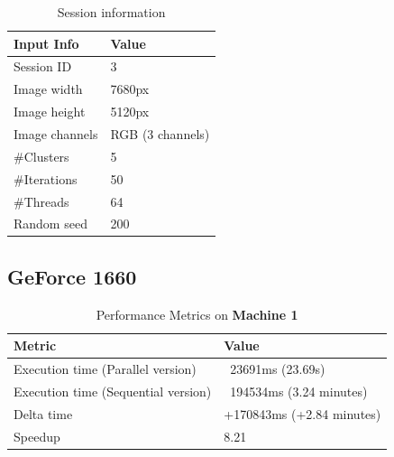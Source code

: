     \begin{table}[H]
        \centering
        \begin{tabular}{|l|l|}
        \hline
        \textbf{Input Info}                    & \textbf{Value}                       \\ \hline
        Session ID                             & 3                                     \\ \hline
        Image width                            & 7680px                                \\ \hline
        Image height                           & 5120px                                \\ \hline
        Image channels                         & RGB (3 channels)                      \\ \hline
        \#Clusters                             & 5                                     \\ \hline
        \#Iterations                           & 50                                    \\ \hline
        \#Threads                              & 64                                    \\ \hline
        Random seed                            & 200                                   \\ \hline
        \end{tabular}
        \caption{Session information}
        \label{tab:session_information_test4}
        \end{table}
        

\subsection{GeForce 1660}

\begin{table}[H]
    \centering
    \begin{tabular}{|l|l|}
    \hline
    \textbf{Metric}                         & \textbf{Value}                       \\ \hline
    Execution time (Parallel version)       & ~23691ms (23.69s)                     \\ \hline
    Execution time (Sequential version)     & ~194534ms (3.24 minutes)              \\ \hline
    Delta time                               & +170843ms (+2.84 minutes)            \\ \hline
    Speedup                                  & 8.21                                   \\ \hline
    \end{tabular}
    \caption{Performance Metrics on \textbf{Machine 1}}
    \label{table:performance_metrics_test4_machine1}
\end{table}


